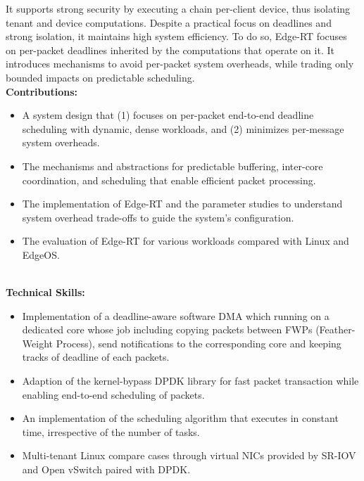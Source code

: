 It supports strong security by executing a chain per-client device, thus isolating tenant and device computations.
Despite a practical focus on deadlines and strong isolation, it maintains high system efficiency.
To do so, Edge-RT focuses on per-packet deadlines inherited by the computations that operate on it.
It introduces mechanisms to avoid per-packet system overheads, while trading only bounded impacts on predictable scheduling.
\\
\textbf{\small Contributions:}
\begin{itemize}[leftmargin=*]
  \setlength\itemsep{-0.0em}
        \item A system design that (1) focuses on per-packet end-to-end deadline scheduling with dynamic, dense workloads, and (2) minimizes per-message system overheads.
        \item The mechanisms and abstractions for predictable buffering, inter-core coordination, and scheduling that enable efficient packet processing.
        \item The implementation of Edge-RT and the parameter studies to understand system overhead trade-offs to guide the
system’s configuration.
        \item The evaluation of Edge-RT for various workloads compared with Linux and EdgeOS.
\end{itemize}
\vspace{-1.0em}
\
\\
\textbf{\small Technical Skills:}
\begin{itemize}[leftmargin=*]
   \setlength\itemsep{-0.0em}
   	\item Implementation of a deadline-aware software DMA which running on a dedicated core whose job including copying packets between FWPs (Feather-Weight Process), send notifications to the corresponding core and keeping tracks of deadline of each packets.
   	\item Adaption of the kernel-bypass DPDK library for fast packet transaction while enabling end-to-end scheduling of packets.
	\item An implementation of the scheduling algorithm that executes in constant time, irrespective of the number of tasks.
	\item Multi-tenant Linux compare cases through virtual NICs provided by SR-IOV and Open vSwitch paired with DPDK.
\end{itemize}
